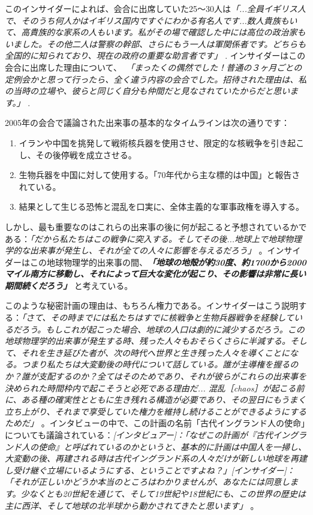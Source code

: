 \documentclass[10pt,twocolumn,letterpaper]{article}
\begin{document}
このインサイダーによれば、会合に出席していた25～30人は\textit{「...全員イギリス人で、そのうち何人かはイギリス国内ですぐにわかる有名人です...数人貴族もいて、高貴族的な家系の人もいます。私がその場で確認した中には高位の政治家もいました。その他二人は警察の幹部、さらにもう一人は軍関係者です。どちらも全国的に知られており、現在の政府の重要な助言者です」} \cite{4}. インサイダーはこの会合に出席した理由について、\ \textit{「まったくの偶然でした！普通の３ヶ月ごとの定例会かと思って行ったら、全く違う内容の会合でした。招待された理由は、私の当時の立場や、彼らと同じく自分も仲間だと見なされていたからだと思います。」} \cite{4}.

2005年の会合で議論された出来事の基本的なタイムラインは次の通りです：
\begin{flushleft}
\begin{enumerate}
    \item イランや中国を挑発して戦術核兵器を使用させ、限定的な核戦争を引き起こし、その後停戦を成立させる。
    \item 生物兵器を中国に対して使用する。「70年代から主な標的は中国」と報告されている。
    \item 結果として生じる恐怖と混乱を口実に、全体主義的な軍事政権を導入する。
\end{enumerate}
\end{flushleft}

しかし、最も重要なのはこれらの出来事の後に何が起こると予想されているかである：\textit{「だから私たちはこの戦争に突入する。そしてその後...地球上で地球物理学的な出来事が発生し、それが全ての人々に影響を与えるだろう」} \cite{4}。インサイダーはこの地球物理学的出来事の間、\textit{\textbf{「地球の地殻が約30度、約1700から2000マイル南方に移動し、それによって巨大な変化が起こり、その影響は非常に長い期間続くだろう」}} \cite{4}と考えている。

このような秘密計画の理由は、もちろん権力である。インサイダーはこう説明する：\textit{「さて、その時までには私たちはすでに核戦争と生物兵器戦争を経験しているだろう。もしこれが起こった場合、地球の人口は劇的に減少するだろう。この地球物理学的出来事が発生する時、残った人々もおそらくさらに半減する。そして、それを生き延びた者が、次の時代へ世界と生き残った人々を導くことになる。つまり私たちは大変動後の時代について話している。誰が主導権を握るのか？誰が支配するのか？全てはそのためであり、それが彼らがこれらの出来事を決められた時間枠内で起こそうと必死である理由だ... 混乱［chaos］が起こる前に、ある種の確実性とともに生き残れる構造が必要であり、その翌日にもうまく立ち上がり、それまで享受していた権力を維持し続けることができるようにするためだ」} \cite{4}。インタビューの中で、この計画の名前「古代イングランド人の使命」についても議論されている：\textit{[インタビュアー]：「なぜこの計画が『古代イングランド人の使命』と呼ばれているのかというと、基本的に計画は中国人を一掃し、大変動の後、再建される時は古代イングランド系の人々だけが新しい地球を再建し受け継ぐ立場にいるようにする、ということですよね？」[インサイダー]：「それが正しいかどうか本当のところはわかりませんが、あなたには同意します。少なくとも20世紀を通じて、そして19世紀や18世紀にも、この世界の歴史は主に西洋、そして地球の北半球から動かされてきたと思います」} \cite{4}。
\end{document}

